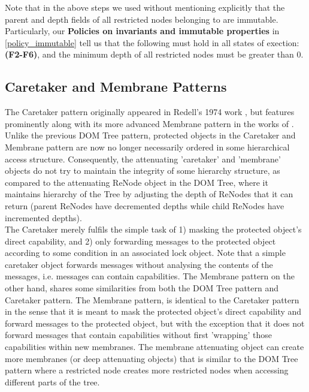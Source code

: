 \documentclass[a4paper,11pt,twoside]{article}
\begin{document}
Note that in the above steps we used without mentioning explicitly that the parent and depth fields of all restricted nodes belonging to  are immutable. Particularly, our \textbf{Policies on invariants and immutable properties} in \cref{policy_immutable} tell us that the following must hold in all states of exection: \textbf{(F2-F6)}, and the minimum depth of all restricted nodes must be greater than 0.
\clearpage
\subsection{Caretaker and Membrane Patterns}

The Caretaker pattern originally appeared in Redell's 1974 work {\cite{redell1974}, but features prominently along with its more advanced Membrane pattern in the works of \cite{miller2006,murray2010,swasey2017}. Unlike the previous DOM Tree pattern, protected objects in the Caretaker and Membrane pattern are now no longer necessarily ordered in some hierarchical access structure. Consequently, the attenuating 'caretaker' and 'membrane' objects do not try to maintain the integrity of some hierarchy structure, as compared to the attenuating ReNode object in the DOM Tree, where it maintains hierarchy of the Tree by adjusting the depth of ReNodes that it can return (parent ReNodes have decremented depths while child ReNodes have incremented depths).\\

The Caretaker merely fulfils the simple task of 1) masking the protected object's direct capability, and 2) only forwarding messages to the protected object according to some condition in an associated lock object. Note that a simple caretaker object forwards messages without analysing the contents of the messages, i.e. messages can contain capabilities. The Membrane pattern on the other hand, shares some similarities from both the DOM Tree pattern and Caretaker pattern. The Membrane pattern, is identical to the Caretaker pattern in the sense that it is meant to mask the protected object's direct capability and forward messages to the protected object, but with the exception that it does not forward messages that contain capabilities without first 'wrapping' those capabilities within new membranes. The membrane attenuating object can create more membranes (or deep attenuating objects) that is similar to the DOM Tree pattern where a restricted node creates more restricted nodes when accessing different parts of the tree.\\

}
\end{document}
